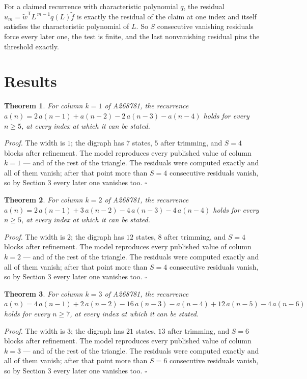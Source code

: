 \documentclass[11pt]{article}
\newtheorem{theorem}{Theorem}
\theoremstyle{definition}
\begin{document}
For a claimed recurrence with characteristic polynomial $q$, the residual $u_m = \tilde w^{\mathsf T}L^{\,m-1}q(L)\tilde f$ is exactly the residual of the claim at one index and itself satisfies the characteristic polynomial of $L$. So $S$ consecutive vanishing residuals force every later one, the test is finite, and the last nonvanishing residual pins the threshold exactly.

\section{Results}

\begin{theorem} For column $k = 1$ of A268781, the recurrence $a(n) = 2\,a(n-1) + a(n-2) - 2\,a(n-3) - a(n-4)$ holds for every $n \ge 5$, at every index at which it can be stated.\end{theorem}

{\itshape Proof.} The width is $1$; the digraph has $7$ states, $5$ after trimming, and $S = 4$ blocks after refinement. The model reproduces every published value of column $k = 1$ --- and of the rest of the triangle. The residuals were computed exactly and all of them vanish; after that point more than $S = 4$ consecutive residuals vanish, so by Section 3 every later one vanishes too. $\square$

\begin{theorem} For column $k = 2$ of A268781, the recurrence $a(n) = 2\,a(n-1) + 3\,a(n-2) - 4\,a(n-3) - 4\,a(n-4)$ holds for every $n \ge 5$, at every index at which it can be stated.\end{theorem}

{\itshape Proof.} The width is $2$; the digraph has $12$ states, $8$ after trimming, and $S = 4$ blocks after refinement. The model reproduces every published value of column $k = 2$ --- and of the rest of the triangle. The residuals were computed exactly and all of them vanish; after that point more than $S = 4$ consecutive residuals vanish, so by Section 3 every later one vanishes too. $\square$

\begin{theorem} For column $k = 3$ of A268781, the recurrence $a(n) = 4\,a(n-1) + 2\,a(n-2) - 16\,a(n-3) - a(n-4) + 12\,a(n-5) - 4\,a(n-6)$ holds for every $n \ge 7$, at every index at which it can be stated.\end{theorem}

{\itshape Proof.} The width is $3$; the digraph has $21$ states, $13$ after trimming, and $S = 6$ blocks after refinement. The model reproduces every published value of column $k = 3$ --- and of the rest of the triangle. The residuals were computed exactly and all of them vanish; after that point more than $S = 6$ consecutive residuals vanish, so by Section 3 every later one vanishes too. $\square$
\end{document}
